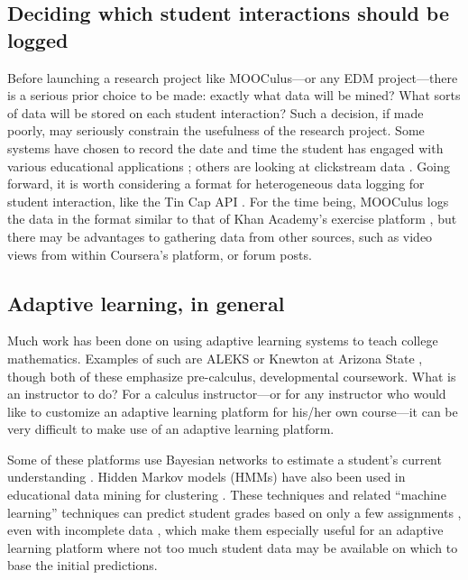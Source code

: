 \documentclass[12pt]{article}
\begin{document}
\subsection{Deciding which student interactions should be logged}

Before launching a research project like MOOCulus---or any EDM
project---there is a serious prior choice to be made: exactly what
data will be mined?  What sorts of data will be stored on each student
interaction?  Such a decision, if made poorly, may seriously constrain
the usefulness of the research project.  Some systems have chosen to
record the date and time the student has engaged with various
educational applications \parencite{RomeroZaldivar20121058}; others
are looking at clickstream data \parencite{boyer2013student}.  Going
forward, it is worth considering a format for heterogeneous data
logging for student interaction, like the Tin Cap
API \parencite{tin-can-api}.  For the time being, MOOCulus logs the
data in the format similar to that of Khan Academy's exercise platform
\cite{khan-academy}, but there may be advantages to gathering data
from other sources, such as video views from within Coursera's
platform, or forum posts.

\subsection{Adaptive learning, in general}

Much work has been done on using adaptive learning systems to teach
college mathematics.  Examples of such are
ALEKS \parencite{hagerty2005using} or Knewton at Arizona
State \parencite{parry2012big}, though both of these emphasize
pre-calculus, developmental coursework.  What is an instructor to do?
For a calculus instructor---or for any instructor who would like to
customize an adaptive learning platform for his/her own course---it
can be very difficult to make use of an adaptive learning platform.

Some of these platforms use Bayesian networks to estimate a student's
current understanding \parencite{romero2010educational}.  Hidden
Markov models (HMMs) have also been used in educational data mining
for clustering
\parencite{shihdiscovery}.  These techniques and related ``machine
learning'' techniques can predict student grades based on only a few
assignments \parencite{predict-grades}, even with incomplete
data \parencite{Zafra201115020}, which make them especially useful for
an adaptive learning platform where not too much student data may be
available on which to base the initial predictions.
\end{document}
